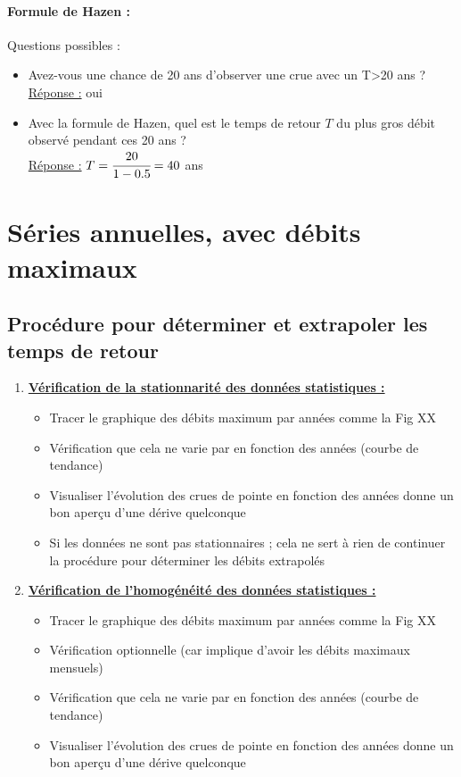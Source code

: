 \paragraph{Formule de Hazen :} Questions possibles :
\begin{itemize}
    \item Avez-vous une chance de 20 ans d'observer une crue avec un T>20 ans ? \\
    \underline{Réponse :} oui 
    \item Avec la formule de Hazen, quel est le temps de retour $T$ du plus gros débit observé pendant ces 20 ans ? \\
    \underline{Réponse :} $T = \cfrac{20}{1-0.5} = 40$ ans
\end{itemize}

\section{Séries annuelles, avec débits maximaux}

\subsection{Procédure pour déterminer et extrapoler les temps de retour}
\begin{enumerate}
    \item \textbf{\underline{Vérification de la stationnarité des données statistiques :}} \\
    \begin{itemize}
        \item Tracer le graphique des débits maximum par années comme la Fig XX
        \item Vérification que cela ne varie par en fonction des années (courbe de tendance)
        \item Visualiser l'évolution des crues de pointe en fonction des années donne un bon aperçu d'une dérive quelconque
        \item \Warning Si les données ne sont pas stationnaires ; cela ne sert à rien de continuer la procédure pour déterminer les débits extrapolés
    \end{itemize}
    \bigskip
    \item \textbf{\underline{Vérification de l'homogénéité des données statistiques :}}
    \begin{itemize}
        \item Tracer le graphique des débits maximum par années comme la Fig XX
        \item Vérification optionnelle (car implique d'avoir les débits maximaux mensuels)
        \item Vérification que cela ne varie par en fonction des années (courbe de tendance)
        \item Visualiser l'évolution des crues de pointe en fonction des années donne un bon aperçu d'une dérive quelconque
    \end{itemize}
\end{enumerate}

